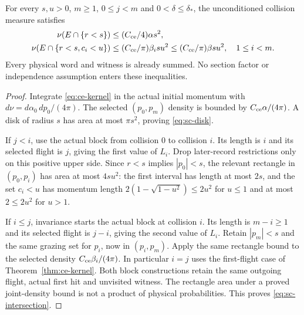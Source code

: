 \begin{lemma}
\label{lem:sc-intersection}
For every $s,u>0$, $m\ge1$, $0\le j<m$ and
$0<\delta\le\delta_*$, the unconditioned collision measure satisfies
\begin{align}
 \nu(E\cap\{r<s\})
   &\le (C_{\rm ce}/4)\alpha s^2,                 \label{eq:sc-disk}\\
 \nu(E\cap\{r<s,c_i<u\})
   &\le (C_{\rm ce}/\pi)\beta_i s u^2
    \le (C_{\rm ce}/\pi)\beta s u^2,\quad1\le i<m.
                                           \label{eq:sc-intersection}
\end{align}
Every physical word and witness is already summed.  No section factor
or independence assumption enters these inequalities.
\end{lemma}
\begin{proof}
Integrate \eqref{eq:ce-kernel} in the actual initial momentum with
$d\nu=d\alpha_0\,dp_0/(4\pi)$.  The selected $(p_0,p_m)$ density is
bounded by $C_{\rm ce}\alpha/(4\pi)$.  A disk of radius $s$ has area
at most $\pi s^2$, proving \eqref{eq:sc-disk}.

If $j<i$, use the actual block from collision $0$ to collision $i$.
Its length is $i$ and its selected flight is $j$, giving the first
value of $L_i$.  Drop later-record restrictions only on this positive
upper side.  Since $r<s$ implies $|p_0|<s$, the relevant rectangle
in $(p_0,p_i)$ has area at most $4su^2$: the first interval has
length at most $2s$, and the set $c_i<u$ has momentum length
$2(1-\sqrt{1-u^2})\le2u^2$ for $u\le1$ and at most $2\le2u^2$
for $u>1$.

If $i\le j$, invariance starts the actual block at collision $i$.
Its length is $m-i\ge1$ and its selected flight is $j-i$, giving
the second value of $L_i$.  Retain $|p_m|<s$ and the same grazing
set for $p_i$, now in $(p_i,p_m)$.  Apply the same rectangle bound
to the selected density $C_{\rm ce}\beta_i/(4\pi)$.
In particular $i=j$ uses the first-flight case of
Theorem~\ref{thm:ce-kernel}.  Both block constructions retain the same
outgoing flight, actual first hit and unvisited witness.  The
rectangle area under a proved joint-density bound is not a product
of physical probabilities.  This proves \eqref{eq:sc-intersection}.
\end{proof}

